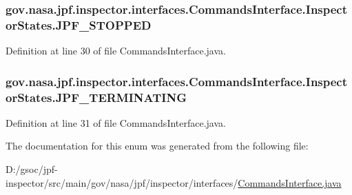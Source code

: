 \subsubsection[{\texorpdfstring{J\+P\+F\+\_\+\+S\+T\+O\+P\+P\+ED}{JPF_STOPPED}}]{\setlength{\rightskip}{0pt plus 5cm}gov.\+nasa.\+jpf.\+inspector.\+interfaces.\+Commands\+Interface.\+Inspector\+States.\+J\+P\+F\+\_\+\+S\+T\+O\+P\+P\+ED}\hypertarget{enumgov_1_1nasa_1_1jpf_1_1inspector_1_1interfaces_1_1_commands_interface_1_1_inspector_states_a63e33a2ed587c9bf523154e85100e6bd}{}\label{enumgov_1_1nasa_1_1jpf_1_1inspector_1_1interfaces_1_1_commands_interface_1_1_inspector_states_a63e33a2ed587c9bf523154e85100e6bd}


Definition at line 30 of file Commands\+Interface.\+java.

\subsubsection[{\texorpdfstring{J\+P\+F\+\_\+\+T\+E\+R\+M\+I\+N\+A\+T\+I\+NG}{JPF_TERMINATING}}]{\setlength{\rightskip}{0pt plus 5cm}gov.\+nasa.\+jpf.\+inspector.\+interfaces.\+Commands\+Interface.\+Inspector\+States.\+J\+P\+F\+\_\+\+T\+E\+R\+M\+I\+N\+A\+T\+I\+NG}\hypertarget{enumgov_1_1nasa_1_1jpf_1_1inspector_1_1interfaces_1_1_commands_interface_1_1_inspector_states_a3c4bb56ddbe380b75500261d0eed34d5}{}\label{enumgov_1_1nasa_1_1jpf_1_1inspector_1_1interfaces_1_1_commands_interface_1_1_inspector_states_a3c4bb56ddbe380b75500261d0eed34d5}


Definition at line 31 of file Commands\+Interface.\+java.



The documentation for this enum was generated from the following file\+:\begin{DoxyCompactItemize}
\item 
D\+:/gsoc/jpf-\/inspector/src/main/gov/nasa/jpf/inspector/interfaces/\hyperlink{_commands_interface_8java}{Commands\+Interface.\+java}\end{DoxyCompactItemize}
